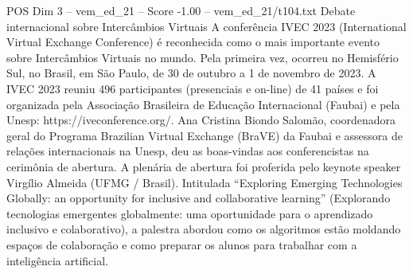 \begin{textsample}{POS Dim 3 – vem\_ed\_21 – Score -1.00 – vem\_ed\_21/t104.txt}  \label{ex:f3_pos_069}
Debate internacional sobre Intercâmbios Virtuais A conferência IVEC 2023 (International Virtual Exchange Conference) é reconhecida como o mais importante evento sobre Intercâmbios Virtuais no mundo.
Pela primeira vez, ocorreu no Hemisfério Sul, no Brasil, em São Paulo, de 30 de outubro a 1 de novembro de 2023.
A IVEC 2023 reuniu 496 participantes (presenciais e on-line) de 41 países e foi organizada pela Associação Brasileira de Educação Internacional (Faubai) e pela Unesp: https://iveconference.org/.
Ana Cristina Biondo Salomão, coordenadora geral do Programa Brazilian Virtual Exchange (BraVE) da Faubai e assessora de relações internacionais na Unesp, deu as boas-vindas aos conferencistas na cerimônia de abertura.
A plenária de abertura foi proferida pelo keynote speaker Virgílio Almeida (UFMG / Brasil).
Intitulada “Exploring Emerging Technologies Globally: an opportunity for inclusive and collaborative learning” (Explorando tecnologias emergentes globalmente: uma oportunidade para o aprendizado inclusivo e colaborativo), a palestra abordou como os algoritmos estão moldando espaços de colaboração e como preparar os alunos para trabalhar com a inteligência artificial.

\end{textsample}
